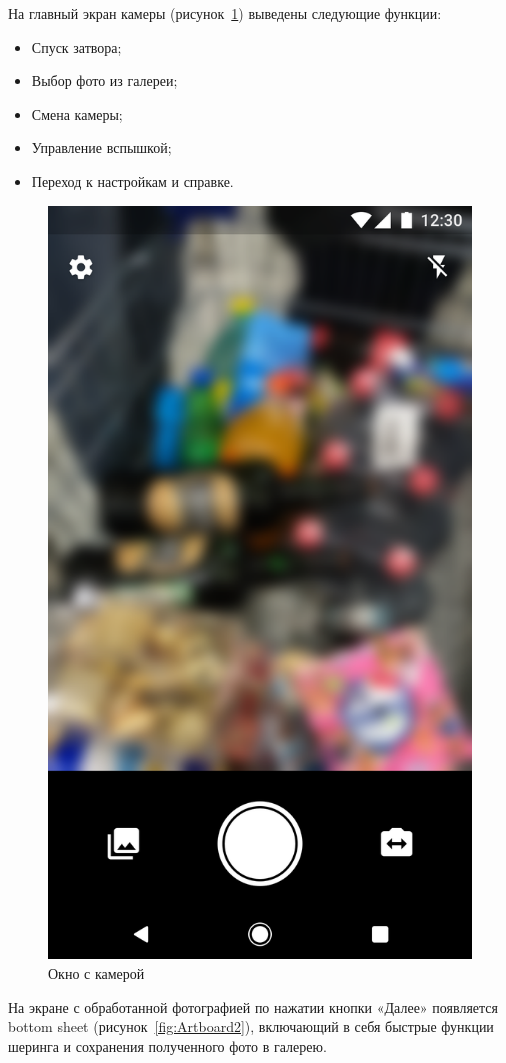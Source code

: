 На главный экран камеры (рисунок~\ref{fig:Artboard}) выведены следующие функции:

\begin{itemize}
	\item Спуск затвора;
	\item Выбор фото из галереи;
	\item Смена камеры;
	\item Управление вспышкой;
	\item Переход к настройкам и справке.
\end{itemize}

\begin{figure}[H]
	\centering
	\includegraphics[width=0.6\linewidth]{pics/Artboard}
	\caption{Окно с камерой}
	\label{fig:Artboard}
\end{figure}

На экране с обработанной фотографией по нажатии кнопки «Далее» появляется bottom sheet (рисунок~\ref{fig:Artboard2}), включающий в себя быстрые функции шеринга и сохранения полученного фото в галерею.

